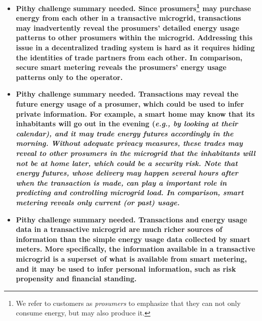\begin{itemize}[itemsep=0.25\parskip,topsep=-0.5\parskip]
\item \bf{Pithy challenge summary needed.} Since prosumers\footnote{We
  refer to customers as \emph{prosumers} to emphasize that they can
  not only consume energy, but may also produce it.} may purchase
  energy from each other in a transactive microgrid, transactions may
  inadvertently reveal the prosumers' detailed energy usage patterns
  to other prosumers within the microgrid.  Addressing this issue in a
  decentralized trading system is hard as it requires hiding the
  identities of trade partners from each other. In comparison, secure
  smart metering reveals the prosumers' energy usage patterns only to
  the operator.

\item \bf{Pithy challenge summary needed.}   Transactions may reveal
  the future energy usage of a prosumer, which could be used to infer
  private information.  For example, a smart home may know that its
  inhabitants will go out in the evening (\em{e.g.}, by looking at
  their calendar), and it may trade energy futures accordingly in the
  morning.  Without adequate privacy measures, these trades may reveal
  to other prosumers in the microgrid that the inhabitants will not be
  at home later, which could be a security risk.  Note that energy
  futures, whose delivery may happen several hours after when the
  transaction is made, can play a important role in predicting and
  controlling microgrid load.  In comparison, smart metering reveals
  only current (or past) usage.

\item \bf{Pithy challenge summary needed.} Transactions and energy
  usage data in a transactive microgrid are much richer sources of
  information than the simple energy usage data collected by smart
  meters.  More specifically, the information available in a
  transactive microgrid is a superset of what is available from smart
  metering, and it may be used to infer personal information, such as
  risk propensity and financial standing.
\end{itemize}
\vspace{0.5\parskip}

